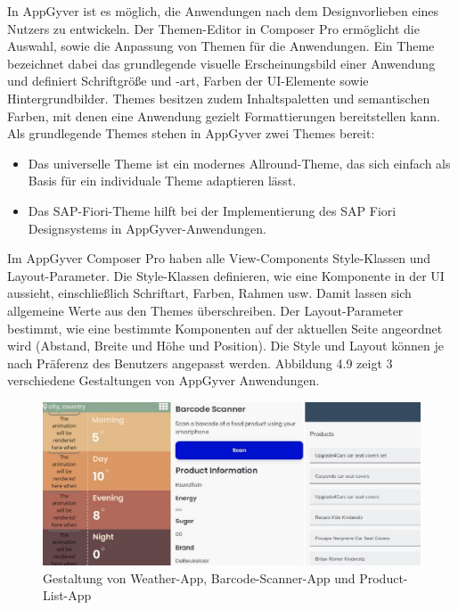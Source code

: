 In AppGyver ist es möglich, die Anwendungen nach dem Designvorlieben eines Nutzers zu entwickeln. Der Themen-Editor in Composer Pro ermöglicht die Auswahl, sowie die Anpassung von Themen für die Anwendungen. Ein Theme bezeichnet dabei das grundlegende visuelle Erscheinungsbild einer Anwendung und definiert Schriftgröße und -art, Farben der UI-Elemente sowie Hintergrundbilder\cite{hel:the}. Themes besitzen zudem Inhaltspaletten und semantischen Farben, mit denen eine Anwendung gezielt Formattierungen bereitstellen kann\cite{appg:the}. Als grundlegende Themes stehen in AppGyver zwei Themes bereit: 

\begin{itemize}[noitemsep]
\item Das universelle Theme ist ein modernes Allround-Theme, das sich einfach als Basis für ein individuale Theme adaptieren lässt.
\item Das SAP-Fiori-Theme hilft bei der Implementierung des SAP Fiori Designsystems in AppGyver-Anwendungen\cite{har:new}.
\end{itemize}

Im AppGyver Composer Pro haben alle View-Components Style-Klassen und Layout-Parameter. Die Style-Klassen definieren, wie eine Komponente in der UI aussieht, einschließlich Schriftart, Farben, Rahmen usw. Damit lassen sich allgemeine Werte aus den Themes überschreiben. Der Layout-Parameter bestimmt, wie eine bestimmte Komponenten auf der aktuellen Seite angeordnet wird (Abstand, Breite und Höhe und Position). Die Style und Layout können je nach Präferenz des Benutzers angepasst werden. Abbildung 4.9 zeigt 3 verschiedene Gestaltungen von AppGyver Anwendungen.

\begin{figure}[htbp]
 \centering
 \includegraphics[width=1.0\textwidth]{Bilder/appgyver/4_9_1_gestaltung.jpg}
 \caption{Gestaltung von Weather-App, Barcode-Scanner-App und Product-List-App}
\end{figure}

